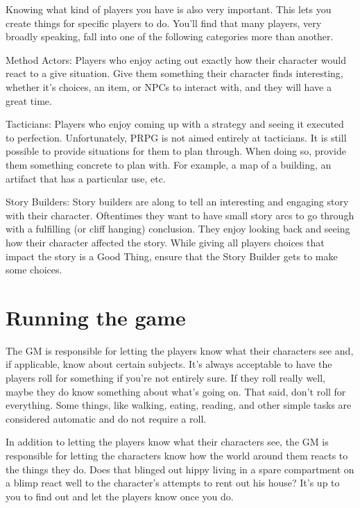 \begin{flushleft}
Knowing what kind of players you have is also very important. This lets you
create things for specific players to do. You'll find that many players, very
broadly speaking, fall into one of the following categories more than another.

Method Actors: Players who enjoy acting out exactly how their character would
react to a give situation. Give them something their character finds
interesting, whether it's choices, an item, or NPCs to interact with, and they
will have a great time.

Tacticians: Players who enjoy coming up with a strategy and seeing it executed
to perfection. Unfortunately, PRPG is not aimed entirely at tacticians. It is
still possible to provide situations for them to plan through. When doing so,
provide them something concrete to plan with. For example, a map of a building,
an artifact that has a particular use, etc.

Story Builders: Story builders are along to tell an interesting and engaging
story with their character. Oftentimes they want to have small story arcs to
go through with a fulfilling (or cliff hanging) conclusion. They enjoy looking
back and seeing how their character affected the story. While giving all players
choices that impact the story is a Good Thing, ensure that the Story Builder
gets to make some choices.

\section*{Running the game}

The GM is responsible for letting the players know what their characters see
and, if applicable, know about certain subjects. It's always acceptable to
have the players roll for something if you're not entirely sure. If they roll
really well, maybe they do know something about what's going on. That said,
don't roll for everything. Some things, like walking, eating, reading, and
other simple tasks are considered automatic and do not require a roll.

In addition to letting the players know what their characters see, the GM is
responsible for letting the characters know how the world around them reacts
to the things they do. Does that blinged out hippy living in a spare
compartment on a blimp react well to the character's attempts to rent out his
house? It's up to you to find out and let the players know once you do.


\end{flushleft}
